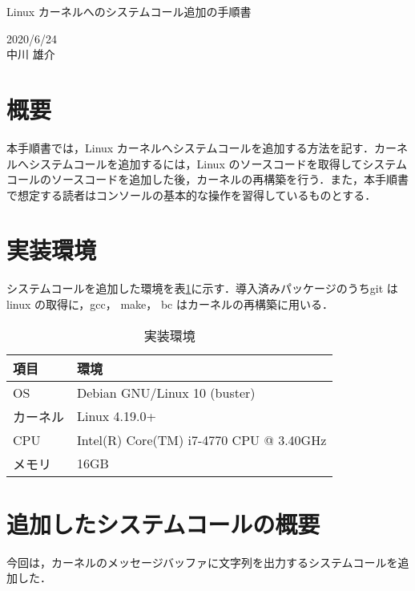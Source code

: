 \documentclass[12pt]{jsarticle}
\begin{document}
\begin{center}
{\LARGE Linux カーネルへのシステムコール追加の手順書}
\end{center}

\begin{flushright}
  2020/6/24\\
  中川 雄介
\end{flushright}
\section{概要}\label{sec:hajime}
\label{sec:introduction}
本手順書では，Linux カーネルへシステムコールを追加する方法を記す．カーネルへシステムコールを追加するには，Linux のソースコードを取得してシステムコールのソースコードを追加した後，カーネルの再構築を行う．また，本手順書で想定する読者はコンソールの基本的な操作を習得しているものとする．

\section{実装環境}\label{sec:env}
システムコールを追加した環境を表\ref{tab:1}に示す．導入済みパッケージのうちgit はlinux の取得に，gcc， make， bc はカーネルの再構築に用いる．
\begin{table}[h]
  \begin{center}
    \caption{実装環境}\label{tab:1}
    \begin{tabular}{l|l}
      \hline\hline
      \multicolumn{1}{l|}{項目} & \multicolumn{1}{l}{環境}\\
      \hline
      OS & Debian GNU/Linux 10 (buster) \\
      カーネル & Linux 4.19.0+\\
      CPU & Intel(R) Core(TM) i7-4770 CPU @ 3.40GHz\\
      メモリ & 16GB\\
      \hline
    \end{tabular}
  \end{center}
\end{table}

\section{追加したシステムコールの概要}\label{sec:gaiyou}
今回は，カーネルのメッセージバッファに文字列を出力するシステムコールを追加した．
\end{document}
